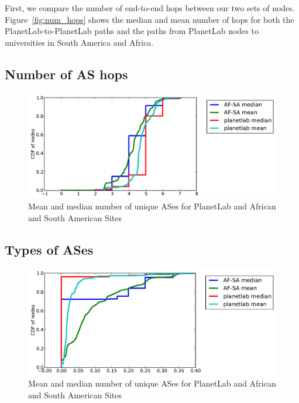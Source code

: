 \documentclass{sig-alternate-10pt}
\begin{document}
First, we compare the number of end-to-end hops between our two sets of nodes.
Figure~\ref{fig:num_hops} shows the median and mean number of hops for both the
PlanetLab-to-PlanetLab paths and the paths from PlanetLab nodes to universities
in South America and Africa. 

\subsection{Number of AS hops}

\begin{figure}
\centering
    \includegraphics[width=1.0\linewidth]{figs/number_of_ases.pdf}
    \caption{Mean and median number of unique ASes for PlanetLab and African
and South American Sites}
\end{figure}

\subsection{Types of ASes}

\begin{figure}
\centering
    \includegraphics[width=1.0\linewidth]{figs/fractions_of_types-ltp.pdf}
    \caption{Mean and median number of unique ASes for PlanetLab and African
and South American Sites}
\end{figure}
\end{document}
